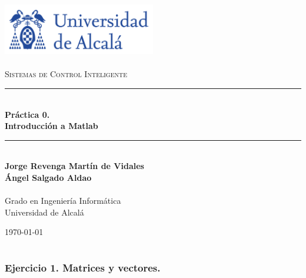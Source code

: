 \documentclass[a4paper, 12pt]{article}
\newcommand{\HRule}{\rule{\linewidth}{0.5mm}}
\begin{document}
	\begin{titlepage}
		\begin{center}
			\includegraphics[width=0.5\textwidth]{figures/logoUAH.png}~\\[2cm]
			
			\textsc{\Large \\Sistemas de Control Inteligente}\\[2cm]
			
			\HRule \\[0.4cm]
			{\LARGE \bfseries Práctica 0. \\ Introducción a Matlab \\[0.4cm]}
			\HRule \\[3cm]
			
			\large\textbf{Jorge Revenga Martín de Vidales}\\
			\large\textbf{Ángel Salgado Aldao}\\
			\large\textbf{}\\ Grado en Ingeniería Informática \\ Universidad de Alcalá
			
			\vfill
			
			{\large \today}
		\end{center}
	\end{titlepage}
	
	\pagestyle{fancy}
	\fancyhf{} %
	\fancyfoot[RO,LE]{\thepage}  %
	\newpage
	
	\thispagestyle{plain}
	\tableofcontents
	\newpage
    
    \part{}
	
	\section{Ejercicio 1. Matrices y vectores.}
	
\end{document}
